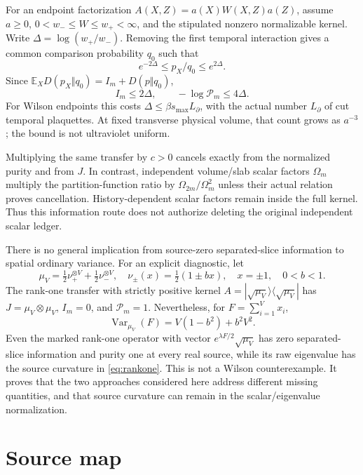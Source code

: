 \documentclass[11pt,letterpaper]{article}
\theoremstyle{remark}\newtheorem{remark}[theorem]{Remark}
\newcommand{\E}{\mathbb E}
\newcommand{\Var}{\operatorname{Var}}\newcommand{\Cov}{\operatorname{Cov}}
\begin{document}
For an endpoint factorization \(A(X,Z)=a(X)W(X,Z)a(Z)\), assume \(a\ge0\), \(0<w_-\le W\le w_+<\infty\), and the stipulated nonzero normalizable kernel. Write \(\Delta=\log(w_+/w_-)\). Removing the first temporal interaction gives a common comparison probability \(q_0\) such that
\[
 e^{-2\Delta}\le p_X/q_0\le e^{2\Delta}.
\]
Since \(\E_XD(p_X\Vert q_0)=I_m+D(p\Vert q_0)\),
\[
 I_m\le2\Delta,\qquad -\log\mathcal P_m\le4\Delta.
\]
For Wilson endpoints this costs \(\Delta\le\beta s_{\max}L_\partial\), with the actual number \(L_\partial\) of cut temporal plaquettes. At fixed transverse physical volume, that count grows as \(a^{-3}\); the bound is not ultraviolet uniform.

Multiplying the same transfer by \(c>0\) cancels exactly from the normalized purity and from \(J\). In contrast, independent volume/slab scalar factors \(\Omega_m\) multiply the partition-function ratio by \(\Omega_{2m}/\Omega_m^2\) unless their actual relation proves cancellation. History-dependent scalar factors remain inside the full kernel. Thus this information route does not authorize deleting the original independent scalar ledger.

There is no general implication from source-zero separated-slice information to spatial ordinary variance. For an explicit diagnostic, let
\[
 \mu_V=\tfrac12\nu_+^{\otimes V}+\tfrac12\nu_-^{\otimes V},
 \quad \nu_\pm(x)=\tfrac12(1\pm bx),\quad x=\pm1,\quad0<b<1.
\]
The rank-one transfer with strictly positive kernel
\(A=|\sqrt{\mu_V}\rangle\langle\sqrt{\mu_V}|\)
has \(J=\mu_V\otimes\mu_V\), \(I_m=0\), and \(\mathcal P_m=1\). Nevertheless, for \(F=\sum_{i=1}^Vx_i\),
\begin{equation}\label{eq:rankone}
 \Var_{\mu_V}(F)=V(1-b^2)+b^2V^2.
\end{equation}
Even the marked rank-one operator with vector \(e^{\lambda F/2}\sqrt{\mu_V}\) has zero separated-slice information and purity one at every real source, while its raw eigenvalue has the source curvature in \eqref{eq:rankone}. This is not a Wilson counterexample. It proves that the two approaches considered here address different missing quantities, and that source curvature can remain in the scalar/eigenvalue normalization.

\section{Source map}
\begingroup\small\setlength{\parskip}{3pt}
\end{document}
